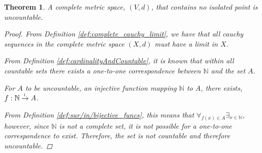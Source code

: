 \documentclass[]{article}
\newcommand{\N}{\mathbb{N}}
\newcommand{\toI}{\xrightarrow{\textsf{\tiny I}}}
\newtheorem{theorem}{Theorem}
\begin{document}
\begin{theorem}
    A complete metric space, $(V,d)$, that contains no isolated point is uncountable.
    \begin{proof}
        From Definition \ref{def:complete_cauchy_limit}, 
        we have that all cauchy sequences in the complete metric space $(X,d)$ must have a limit in $X$.
        
        From Definition \ref{def:cardinalityAndCountable}, 
        it is known that within all countable sets there exists a one-to-one correspondence between $\N$ and the set $A$.
        
        For $A$ to be uncountable, an injective function mapping $\N$ to $A$, there exists, $f : \N \toI A$. 

        From Definition \ref{def:sur/in/bijective_funcs}, this means that 
        $\forall_{f(x) \in A} \exists_{x \in \N}$,
        however, since $\N$ is not a complete set, it is not possible for a one-to-one correspondence to exist.
        Therefore, the set is not countable and therefore uncountable.
    \end{proof}
\end{theorem}
\end{document}
